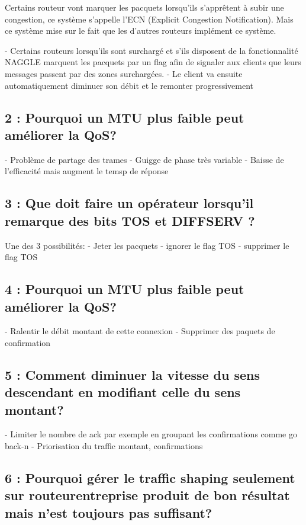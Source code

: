 \documentclass{article}
\begin{document}
Certains routeur vont marquer les pacquets lorsqu'ils s'apprêtent à subir une congestion, ce système s'appelle l'ECN (Explicit Congestion Notification). Mais ce système mise sur le fait que les d'autres routeurs implément ce système. 

- Certains routeurs lorsqu'ils sont surchargé et s'ils disposent de la fonctionnalité NAGGLE marquent les pacquets par un flag afin de signaler aux clients que leurs messages passent par des zones surchargées.
- Le client va ensuite automatiquement diminuer son débit et le remonter progressivement

\subsection*{2 : Pourquoi un MTU plus faible peut améliorer la QoS?}

- Problème de partage des trames
- Guigge de phase très variable
- Baisse de l'efficacité mais augment le temsp de réponse

\subsection*{3 : Que doit faire un opérateur lorsqu'il remarque des bits TOS et DIFFSERV ?}

Une des 3 possibilités:
- Jeter les pacquets
- ignorer le flag TOS
- supprimer le flag TOS

\subsection*{4 : Pourquoi un MTU plus faible peut améliorer la QoS?}

- Ralentir le débit montant de cette connexion
- Supprimer des paquets de confirmation


\subsection*{5 : Comment diminuer la vitesse du sens descendant en modifiant celle du sens montant?}

- Limiter le nombre de ack par exemple en groupant les confirmations comme go back-n
- Priorisation du traffic montant, confirmations


\subsection*{6 : Pourquoi gérer le traffic shaping seulement sur routeurentreprise produit de bon résultat mais n'est toujours pas suffisant?}
\end{document}
